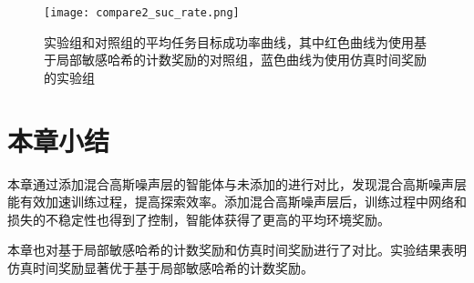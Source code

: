         \begin{figure}[htpb]
        \centering
        \texttt{[image: compare2\_suc\_rate.png]}
        \caption{实验组和对照组的平均任务目标成功率曲线，其中红色曲线为使用基于局部敏感哈希的计数奖励的对照组，蓝色曲线为使用仿真时间奖励的实验组}
            \label{cmp2suc_rate}
        \end{figure}
\section{本章小结}
本章通过添加混合高斯噪声层的智能体与未添加的进行对比，发现混合高斯噪声层能有效加速训练过程，提高探索效率。添加混合高斯噪声层后，训练过程中网络和损失的不稳定性也得到了控制，智能体获得了更高的平均环境奖励。

本章也对基于局部敏感哈希的计数奖励和仿真时间奖励进行了对比。实验结果表明仿真时间奖励显著优于基于局部敏感哈希的计数奖励。

